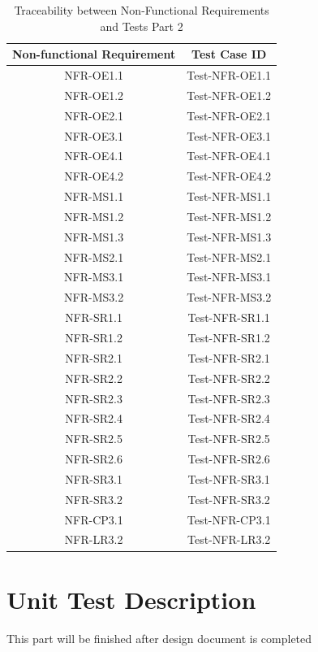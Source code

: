 \documentclass[12pt, titlepage]{article}
\begin{document}
\begin{table}[H]
    \centering
    \begin{tabular}{|c|c|}
    \hline
    Non-functional Requirement & Test Case ID\\
    \hline
    NFR-OE1.1 & Test-NFR-OE1.1\\
    \hline
    NFR-OE1.2 & Test-NFR-OE1.2\\
    \hline
    NFR-OE2.1 & Test-NFR-OE2.1\\
    \hline
    NFR-OE3.1 & Test-NFR-OE3.1\\
    \hline
    NFR-OE4.1 & Test-NFR-OE4.1\\
    \hline
    NFR-OE4.2 & Test-NFR-OE4.2\\
    \hline
    NFR-MS1.1 & Test-NFR-MS1.1\\
    \hline
    NFR-MS1.2 & Test-NFR-MS1.2\\
    \hline
    NFR-MS1.3 & Test-NFR-MS1.3\\
    \hline
    NFR-MS2.1 & Test-NFR-MS2.1\\
    \hline
    NFR-MS3.1 & Test-NFR-MS3.1\\
    \hline
    NFR-MS3.2 & Test-NFR-MS3.2\\
    \hline
    NFR-SR1.1 & Test-NFR-SR1.1\\
    \hline
    NFR-SR1.2 & Test-NFR-SR1.2\\
    \hline
    NFR-SR2.1 & Test-NFR-SR2.1\\
    \hline
    NFR-SR2.2 & Test-NFR-SR2.2\\
    \hline
    NFR-SR2.3 & Test-NFR-SR2.3\\
    \hline
    NFR-SR2.4 & Test-NFR-SR2.4\\
    \hline
    NFR-SR2.5 & Test-NFR-SR2.5\\
    \hline
    NFR-SR2.6 & Test-NFR-SR2.6\\
    \hline
    NFR-SR3.1 & Test-NFR-SR3.1\\
    \hline
    NFR-SR3.2 & Test-NFR-SR3.2\\
    \hline
    NFR-CP3.1 & Test-NFR-CP3.1\\
    \hline
    NFR-LR3.2 & Test-NFR-LR3.2\\
    \hline
    \end{tabular}
    \caption{Traceability between Non-Functional Requirements and Tests Part 2}
\end{table}
\newpage
\section{Unit Test Description}
This part will be finished after design document is completed
\end{document}

